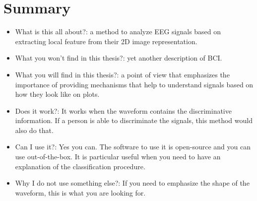 \section{Summary}

\begin{itemize}
\item What is this all about?: a method to analyze EEG signals based on extracting local feature from their 2D image representation.
\item What you won't find in this thesis?: yet another description of BCI.
\item What you will find in this thesis?: a point of view that emphasizes the importance of providing mechanisms that help to understand signals based on how they look like on plots.
\item Does it work?: It works when the waveform contains the discriminative information.  If a person is able to discriminate the signals, this method would also do that.
\item Can I use it?:  Yes you can.  The software to use it is open-source and you can use out-of-the-box.  It is particular useful when you need to have an explanation of the classification procedure.
\item Why I do not use something else?: If you need to emphasize the shape of the waveform, this is what you are looking for.
\end{itemize}

